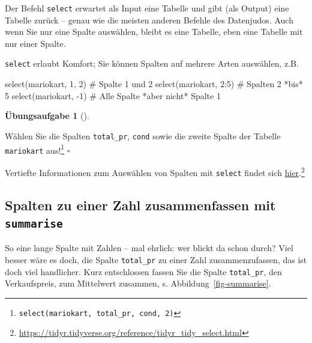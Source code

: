 \documentclass[
  a4paper,
  DIV=11]{scrreprt}
\newenvironment{Shaded}{\begin{snugshade}}{\end{snugshade}}
\newcommand{\CommentTok}[1]{\textcolor[rgb]{0.37,0.37,0.37}{#1}}
\newcommand{\DecValTok}[1]{\textcolor[rgb]{0.68,0.00,0.00}{#1}}
\newcommand{\FunctionTok}[1]{\textcolor[rgb]{0.28,0.35,0.67}{#1}}
\newcommand{\NormalTok}[1]{\textcolor[rgb]{0.00,0.23,0.31}{#1}}
\newcommand{\SpecialCharTok}[1]{\textcolor[rgb]{0.37,0.37,0.37}{#1}}
\theoremstyle{definition}
\newtheorem{exercise}{Übungsaufgabe}[chapter]
\theoremstyle{definition}
\theoremstyle{definition}
\theoremstyle{remark}
\begin{document}
Der Befehl \texttt{select} erwartet als Input eine Tabelle und gibt (als
Output) eine Tabelle zurück -- genau wie die meisten anderen Befehle des
Datenjudos. Auch wenn Sie nur eine Spalte auswählen, bleibt es eine
Tabelle, eben eine Tabelle mit nur einer Spalte.

\texttt{select} erlaubt Komfort; Sie können Spalten auf mehrere Arten
auswählen, z.B.

\begin{Shaded}
\begin{Highlighting}[]
\FunctionTok{select}\NormalTok{(mariokart, }\DecValTok{1}\NormalTok{, }\DecValTok{2}\NormalTok{)  }\CommentTok{\# Spalte 1 und 2}
\FunctionTok{select}\NormalTok{(mariokart, }\DecValTok{2}\SpecialCharTok{:}\DecValTok{5}\NormalTok{)  }\CommentTok{\#  Spalten 2 *bis* 5 }
\FunctionTok{select}\NormalTok{(mariokart, }\SpecialCharTok{{-}}\DecValTok{1}\NormalTok{)  }\CommentTok{\# Alle Spalte *aber nicht* Spalte 1}
\end{Highlighting}
\end{Shaded}

\begin{exercise}[]\protect\hypertarget{exr-select}{}\label{exr-select}

Wählen Sie die Spalten \texttt{total\_pr}, \texttt{cond} sowie die
zweite Spalte der Tabelle \texttt{mariokart} aus!\footnote{\texttt{select(mariokart,\ total\_pr,\ cond,\ 2)}}
\(\square\)

\end{exercise}

Vertiefte Informationen zum Auswählen von Spalten mit \texttt{select}
findet sich
\href{https://tidyr.tidyverse.org/reference/tidyr_tidy_select.html}{hier}.\footnote{\url{https://tidyr.tidyverse.org/reference/tidyr_tidy_select.html}}

\subsection{\texorpdfstring{Spalten zu einer Zahl zusammenfassen mit
\texttt{summarise}}{Spalten zu einer Zahl zusammenfassen mit summarise}}\label{spalten-zu-einer-zahl-zusammenfassen-mit-summarise}

So eine lange Spalte mit Zahlen -- mal ehrlich: wer blickt da schon
durch? Viel besser wäre es doch, die Spalte \texttt{total\_pr} zu einer
Zahl zusammenzufassen, das ist doch viel handlicher. Kurz entschlossen
fassen Sie die Spalte \texttt{total\_pr}, den Verkaufspreis, zum
Mittelwert zusammen, s. Abbildung~\ref{fig-summarise}.
\end{document}
